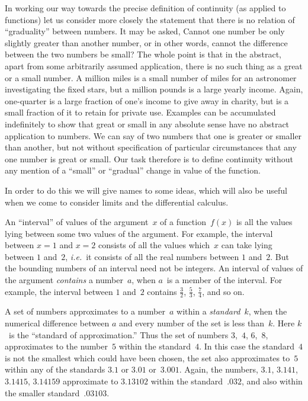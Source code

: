 \documentclass[12pt,leqno]{book}[2005/09/16]
\newcommand{\PageSep}[1]{\ignorespaces}
\newcommand{\ie}{\emph{i.e.}}
\begin{document}
In working our way towards the precise
definition of continuity (as applied to functions)
let us consider more closely the statement
that there is no relation of ``graduality''
between numbers. It may be asked, Cannot
one number be only slightly greater than
another number, or in other words, cannot
the difference between the two numbers be
small? The whole point is that in the abstract,
apart from some arbitrarily assumed
application, there is no such thing as a great
or a small number. A million miles is a
small number of miles for an astronomer
investigating the fixed stars, but a million
\PageSep{158}
pounds is a large yearly income. Again, one-quarter
is a large fraction of one's income to
give away in charity, but is a small fraction
of it to retain for private use. Examples can
be accumulated indefinitely to show that
great or small in any absolute sense have no
abstract application to numbers. We can
say of two numbers that one is greater or
smaller than another, but not without specification
of particular circumstances that any
one number is great or small. Our task
therefore is to define continuity without any
mention of a ``small'' or ``gradual'' change
in value of the function.

In order to do this we will give names to
some ideas, which will also be useful when
we come to consider limits and the differential
calculus.

An ``interval'' of values of the argument~$x$
%
of a function~$f(x)$ is all the values lying
between some two values of the argument.
For example, the interval between $x = 1$ and
$x = 2$ consists of all the values which~$x$ can
take lying between $1$ and~$2$, \ie\ it consists of
all the real numbers between $1$ and~$2$. But
the bounding numbers of an interval need
not be integers. An interval of values of the
argument \emph{contains} a number~$a$, when $a$~is a
member of the interval. For example, the
interval between $1$ and~$2$ contains $\frac{3}{2}$, $\frac{5}{3}$, $\frac{7}{4}$, and
so on.
\PageSep{159}

A set of numbers approximates to a number~$a$
%
within a \emph{standard}~$k$, when the numerical
difference between $a$ and every number of the
set is less than~$k$. Here $k$~is the ``standard
of approximation.'' Thus the set of numbers
$3$,~$4$, $6$,~$8$, approximates to the number~$5$
within the standard~$4$. In this case the
standard~$4$ is not the smallest which could
have been chosen, the set also approximates
to~$5$ within any of the standards $3.1$ or $3.01$
or~$3.001$. Again, the numbers, $3.1$, $3.141$,
$3.1415$, $3.14159$ approximate to $3.13102$ within
the standard~$.032$, and also within the
smaller standard~$.03103$.
\end{document}
